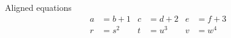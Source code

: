 \documentclass{article}
\begin{document}
Aligned equations
\begin{align*}
a &= b+1 & c &= d+2 & e &= f+3 \\
r &= s^{2} & t &=u^{3} & v &= w^{4}
\end{align*}
\end{document}
